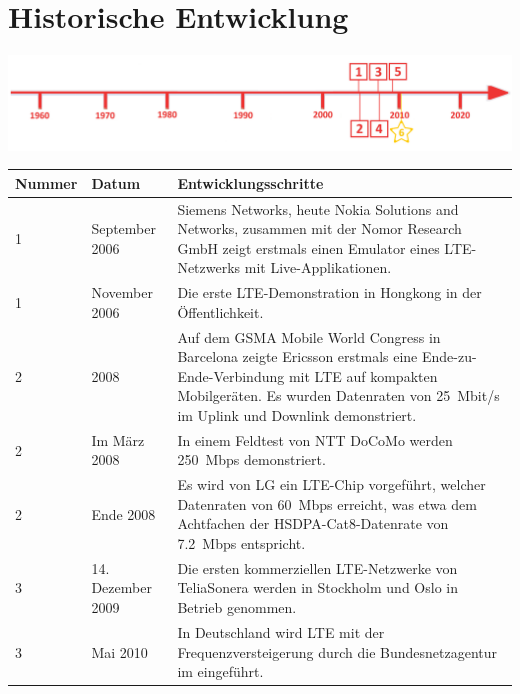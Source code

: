 \section*{Historische Entwicklung}
\includegraphics[width=\textwidth]{Kapitel/4GLTE/Grafiken/Zeitstrahl}
\par
\noindent
\begin{tabular}{|p{1 cm}|p{3 cm}|p{13.55 cm}|}
	\hline
	Nummer & Datum & Entwicklungsschritte\\
	\hline
	1 &  September 2006 & Siemens Networks, heute Nokia Solutions and Networks, zusammen mit der Nomor Research GmbH zeigt erstmals einen Emulator eines LTE-Netzwerks mit Live-Applikationen.\\
	\hline
	1 & November 2006 & Die erste LTE-Demonstration in Hongkong in der Öffentlichkeit. \\
	\hline
	2 & 2008 & Auf dem GSMA Mobile World Congress in Barcelona zeigte Ericsson erstmals eine Ende-zu-Ende-Verbindung mit LTE auf kompakten Mobilgeräten. Es wurden Datenraten von \SI{25}{Mbit/s} im Uplink und Downlink demonstriert.\\
	\hline
	2 & Im März 2008 & In einem Feldtest von NTT DoCoMo werden \SI{250}{Mbps} demonstriert.\\
	\hline
	2 &  Ende 2008 &  Es wird von LG ein LTE-Chip vorgeführt, welcher Datenraten von \SI{60}{Mbps} erreicht, was etwa dem Achtfachen der HSDPA-Cat8-Datenrate von \SI{7,2}{Mbps} entspricht.\\
	\hline
	3 & 14. Dezember 2009 & Die ersten kommerziellen LTE-Netzwerke von TeliaSonera werden in Stockholm und Oslo in Betrieb genommen.\\
	\hline
	3 & Mai 2010 & In Deutschland wird LTE mit der Frequenzversteigerung durch die Bundesnetzagentur im  eingeführt.\\
	\hline
\end{tabular}
\par
